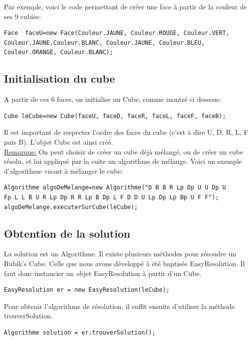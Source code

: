 \documentclass[a4paper,12pt]{article}
\begin{document}
Par exemple, voici le code permettant de créer une face à partir de la couleur de ses 9 cubies:

\begin{verbatim}
Face  faceU=new Face(Couleur.JAUNE, Couleur.ROUGE, Couleur.VERT,
Couleur.JAUNE,Couleur.BLANC, Couleur.JAUNE, Couleur.BLEU, 
Couleur.ORANGE, Couleur.BLANC);
\end{verbatim}


\subsection{Initialisation du cube}

A partir de ces 6 faces, on initialise un Cube, comme montré ci dessous:

\begin{verbatim}
Cube leCube=new Cube(faceU, faceD, faceR, faceL, faceF, faceB);
\end{verbatim}

Il est important de respecter l'ordre des faces du cube (c'est à dire U, D, R, L, F puis B). L'objet Cube est ainsi créé.\\

\underline{Remarque:} On peut choisir de créer un cube déjà mélangé, ou de créer un cube résolu, et lui appliqué par la suite un algorithme de mélange.
Voici un exemple d'algorithme visant à mélanger le cube:
\begin{verbatim}
Algorithme algoDeMelange=new Algorithme("D B B R Lp Dp U U Dp U
Fp L L B U R Lp Dp R R Lp B Dp L F D D U Lp Dp Lp Bp U F F");
algoDeMelange.executerSurCube(leCube);
\end{verbatim}

\subsection{Obtention de la solution}

La solution est un Algorithme.
Il existe plusieurs méthodes pour résoudre un Rubik's Cube. Celle que nous avons développé à été baptisée EasyResolution.
Il faut donc instancier un objet EasyResolution à partir d'un Cube.

\begin{verbatim}
EasyResolution er = new EasyResolution(leCube);
\end{verbatim}

Pour obtenir l'algorithme de résolution, il suffit ensuite d'utiliser la méthode trouverSolution.

\begin{verbatim}
Algorithme solution = er.trouverSolution();
\end{verbatim}
\end{document}
